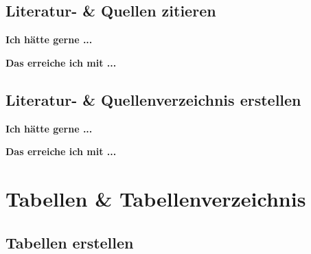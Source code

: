 \documentclass[twoside, 
               a4paper, 
               10pt, 
               parskip=full, 
               sectionentrydots=true, 
               listof=totoc, 
               listof=entryprefix,
               numbers=endperiod]{scrartcl}
\begin{document}
\subsection{Literatur- \& Quellen zitieren}

{\textbf {Ich hätte gerne ...}}
 



\newpage
{\textbf {Das erreiche ich mit ...}}
 
\begin{miniSeite}[colbacktitle=black!35!white,title=\LaTeX-Code]

\end{miniSeite}




\newpage
\subsection{Literatur- \& Quellenverzeichnis erstellen}
{\textbf {Ich hätte gerne ...}}
 
\begin{miniSeite}[colbacktitle=black!35!white,title=Ausdruck]

\end{miniSeite}


\newpage
{\textbf {Das erreiche ich mit ...}}
 
\begin{miniSeite}[colbacktitle=black!35!white,title=\LaTeX-Code]

\end{miniSeite}





\newpage
\section{Tabellen \& Tabellenverzeichnis}
\subsection{Tabellen erstellen}
\end{document}
